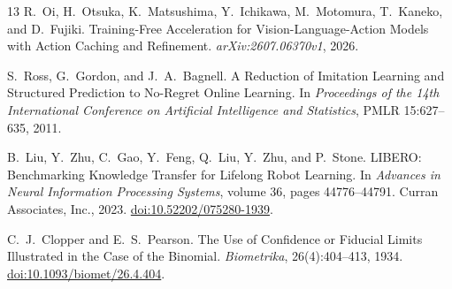 \documentclass[11pt]{article}
\newcommand{\doi}[1]{\href{https://doi.org/#1}{doi:#1}}
\begin{document}
\begin{thebibliography}{13}
R.~Oi, H.~Otsuka, K.~Matsushima, Y.~Ichikawa, M.~Motomura, T.~Kaneko, and D.~Fujiki.
\newblock Training-Free Acceleration for Vision-Language-Action Models with Action Caching and Refinement.
\newblock \emph{arXiv:2607.06370v1}, 2026.

S.~Ross, G.~Gordon, and J.~A.~Bagnell.
\newblock A Reduction of Imitation Learning and Structured Prediction to No-Regret Online Learning.
\newblock In \emph{Proceedings of the 14th International Conference on Artificial Intelligence and Statistics}, PMLR 15:627--635, 2011.

B.~Liu, Y.~Zhu, C.~Gao, Y.~Feng, Q.~Liu, Y.~Zhu, and P.~Stone.
\newblock LIBERO: Benchmarking Knowledge Transfer for Lifelong Robot Learning.
\newblock In \emph{Advances in Neural Information Processing Systems}, volume 36, pages 44776--44791. Curran Associates, Inc., 2023.
\newblock \doi{10.52202/075280-1939}.

C.~J.~Clopper and E.~S.~Pearson.
\newblock The Use of Confidence or Fiducial Limits Illustrated in the Case of the Binomial.
\newblock \emph{Biometrika}, 26(4):404--413, 1934.
\newblock \doi{10.1093/biomet/26.4.404}.

\end{thebibliography}
\end{document}
